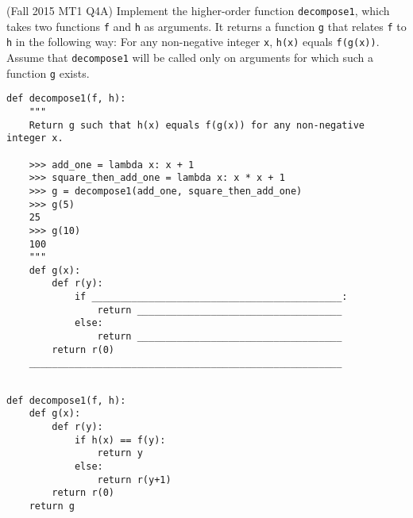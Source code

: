 \begin{blocksection}
\question (Fall 2015 MT1 Q4A) Implement the higher-order function \lstinline$decompose1$, 
which takes two functions \lstinline$f$ and \lstinline$h$ as arguments. It returns a function
\lstinline$g$ that relates \lstinline$f$ to \lstinline$h$ in the following way: For any 
non-negative integer \lstinline$x$, \lstinline$h(x)$ equals \lstinline$f(g(x))$. Assume that 
\lstinline$decompose1$ will be called only on arguments for which such a function 
\lstinline$g$ exists. \\

\begin{lstlisting}
def decompose1(f, h):
    """
    Return g such that h(x) equals f(g(x)) for any non-negative integer x.
    
    >>> add_one = lambda x: x + 1
    >>> square_then_add_one = lambda x: x * x + 1
    >>> g = decompose1(add_one, square_then_add_one)
    >>> g(5)
    25
    >>> g(10)
    100
    """
    def g(x):
        def r(y):
            if ____________________________________________:
                return ____________________________________
            else:
                return ____________________________________
        return r(0)
    _______________________________________________________
    
\end{lstlisting}

\begin{solution}[1.5in]
\begin{lstlisting}
def decompose1(f, h):
    def g(x):
        def r(y):
            if h(x) == f(y):
                return y
            else:
                return r(y+1)
        return r(0)
    return g
\end{lstlisting}
\end{solution}
\end{blocksection}
